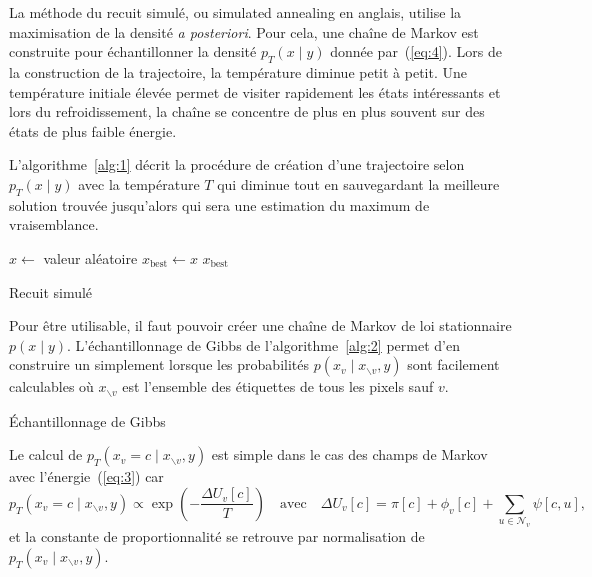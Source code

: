 \documentclass[a4paper,11pt,oneside]{article}
\begin{document}
La méthode du recuit simulé, ou simulated annealing en
anglais, utilise la maximisation de la densité \emph{a
  posteriori}. Pour cela, une chaîne de Markov est
construite pour échantillonner la densité $p_T(x\mid y)$
donnée par~(\ref{eq:4}). Lors de la construction de la
trajectoire, la température diminue petit à petit. Une
température initiale élevée permet de visiter rapidement les
états intéressants et lors du refroidissement, la chaîne se
concentre de plus en plus souvent sur des états de plus
faible énergie.

L'algorithme~\ref{alg:1} décrit la procédure de création
d'une trajectoire selon $p_T(x\mid y)$ avec la température
$T$ qui diminue tout en sauvegardant la meilleure solution
trouvée jusqu'alors qui sera une estimation du maximum de
vraisemblance.

\begin{algorithm}
  $x\longleftarrow$ valeur aléatoire\;
  $x_\text{best} \longleftarrow x$\;
  \Return $x_\text{best}$\;
  \caption{Recuit simulé}
  \label{alg:1}
\end{algorithm}

Pour être utilisable, il faut pouvoir créer une chaîne de
Markov de loi stationnaire $p(x\mid y)$. L'échantillonnage
de Gibbs de l'algorithme~\ref{alg:2} permet d'en construire
un simplement lorsque les probabilités $p(x_v\mid
x_{\backslash v},y)$ sont facilement calculables où
$x_{\backslash v}$ est l'ensemble des étiquettes de tous les
pixels sauf $v$.

\begin{algorithm}
  \caption{Échantillonnage de Gibbs}
  \label{alg:2}
\end{algorithm}

Le calcul de $p_T(x_v=c\mid x_{\backslash v},y)$ est simple
dans le cas des champs de Markov avec l'énergie~(\ref{eq:3})
car
\begin{equation}
  \label{eq:6}
  p_T(x_v=c\mid x_{\backslash v},y)
  \propto
  \exp\left(-\frac{\Delta U_v[c]}T\right)
  \quad\text{avec}\quad
  \Delta U_v[c] = \pi[c] + \phi_v[c]
              + \sum_{u\in\mathcal N_v} \psi[c, u],
\end{equation}
et la constante de proportionnalité se retrouve par
normalisation de $p_T(x_v\mid x_{\backslash v},y)$.
\end{document}
